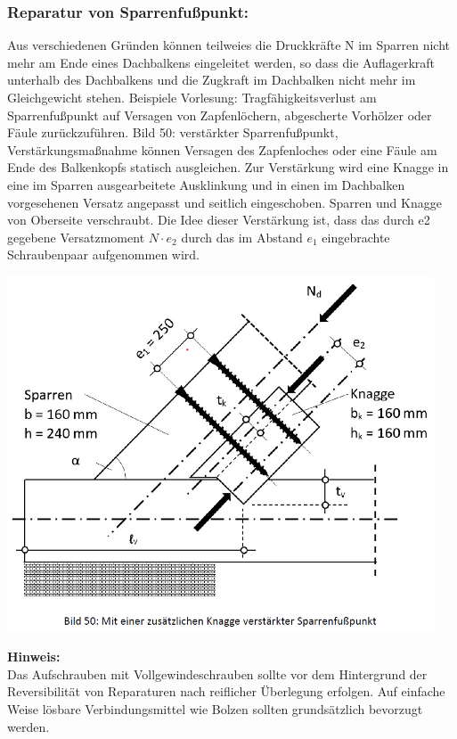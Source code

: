 \documentclass[fleqn,twoside]{article}
\begin{document}
     \subsubsection{Reparatur von Sparrenfußpunkt:}
        \begin{minipage}{0.55\textwidth}
        Aus verschiedenen Gründen können teilweies die Druckkräfte N im Sparren nicht
            mehr am Ende eines Dachbalkens eingeleitet werden, so dass die Auflagerkraft unterhalb
            des Dachbalkens und die Zugkraft im Dachbalken nicht mehr im Gleichgewicht stehen. Beispiele Vorlesung: Tragfähigkeitsverlust am Sparrenfußpunkt auf Versagen von Zapfenlöchern, abgescherte Vorhölzer oder Fäule zurückzuführen. Bild 50: verstärkter Sparrenfußpunkt, Verstärkungsmaßnahme können Versagen des Zapfenloches oder eine Fäule am Ende des Balkenkopfs statisch ausgleichen. Zur Verstärkung wird eine Knagge in eine im Sparren ausgearbeitete Ausklinkung und in einen im Dachbalken vorgesehenen Versatz angepasst und seitlich eingeschoben. Sparren und Knagge von Oberseite verschraubt.
            Die Idee dieser Verstärkung ist, dass das durch e2 gegebene Versatzmoment $N \cdot e_2$ durch das im Abstand $e_1$ eingebrachte Schraubenpaar aufgenommen wird.\\
      
        \end{minipage}
        \begin{minipage}{0.45\textwidth}
        \includegraphics[width=0.95\textwidth]{Grafiken/Denkmalpflegerische Arbeit/Sparrenfusspunkreparatur.png}
        \end{minipage}
        \textbf{Hinweis:}\\
        Das Aufschrauben mit Vollgewindeschrauben sollte vor dem Hintergrund der Reversibilität von Reparaturen nach reiflicher Überlegung erfolgen. Auf einfache Weise lösbare Verbindungsmittel wie Bolzen sollten grundsätzlich bevorzugt werden.
        
\end{document}
